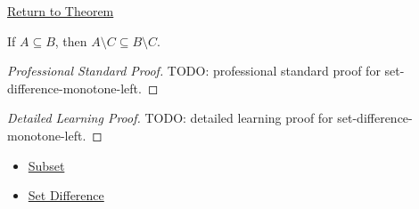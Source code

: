 \newpage
{}
\label{prf:set-difference-monotone-left}

\begin{remark*}[Return]
\hyperref[thm:set-difference-monotone-left]{Return to Theorem}
\end{remark*}

\begin{theorem*}
If $A\subseteq B$, then $A\setminus C\subseteq B\setminus C$.
\end{theorem*}

\begin{proof}[Professional Standard Proof]
\LRAProofBodyStart
TODO: professional standard proof for set-difference-monotone-left.
\end{proof}

\begin{proof}[Detailed Learning Proof]
\LRAProofBodyStart
TODO: detailed learning proof for set-difference-monotone-left.
\end{proof}

\begin{remark*}
\end{remark*}

\begin{dependencies}
\begin{itemize}
  \item \hyperref[def:subset]{Subset}
  \item \hyperref[def:set-difference]{Set Difference}
\end{itemize}
\end{dependencies}

\clearpage
